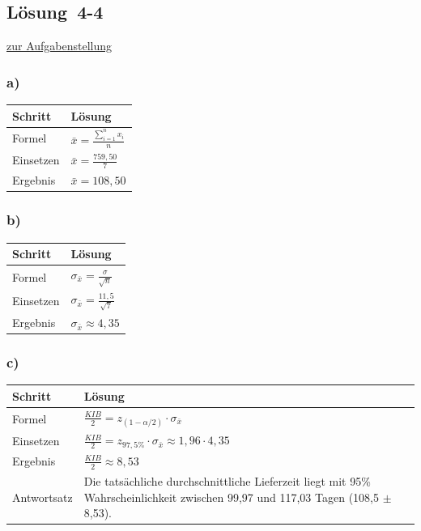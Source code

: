\documentclass[
  11pt,
  ngerman,
  a4paper,
]{report}
\begin{document}
\hypertarget{loesung-4-4}{%
\subsection{Lösung~4-4}\label{loesung-4-4}}

\protect\hyperlink{aufgabe-4-4}{zur Aufgabenstellung}

\hypertarget{a-17}{%
\subsubsection{a)}\label{a-17}}

\begin{table}[H]
\centering
\begin{tabular}{ll}
\toprule
\textbf{Schritt} & \textbf{Lösung}\\
\midrule
Formel & $\bar{x}=\frac{\sum\limits_{i=1}^{n}x_{i}}{n}$\\
Einsetzen & $\bar{x}=\frac{759{,}50}{7}$\\
Ergebnis & $\bar{x}=108{,}50$\\
\bottomrule
\end{tabular}
\end{table}

\hypertarget{b-18}{%
\subsubsection{b)}\label{b-18}}

\begin{table}[H]
\centering
\begin{tabular}{ll}
\toprule
\textbf{Schritt} & \textbf{Lösung}\\
\midrule
Formel & $\sigma_{\bar{x}}=\frac{\sigma}{\sqrt{n}}$\\
Einsetzen & $\sigma_{\bar{x}}=\frac{11{,}5}{\sqrt{7}}$\\
Ergebnis & $\sigma_{\bar{x}}\approx4{,}35$\\
\bottomrule
\end{tabular}
\end{table}

\hypertarget{c-12}{%
\subsubsection{c)}\label{c-12}}

\begin{table}[H]
\centering
\begin{tabular}{ll}
\toprule
\textbf{Schritt} & \textbf{Lösung}\\
\midrule
Formel & $\frac{\mathit{KIB}}{2} = z_{(1-\alpha/2)} \cdot \sigma_{\bar{x}}$\\
Einsetzen & $\frac{\mathit{KIB}}{2} = z_{97{,}5\%} \cdot \sigma_{\bar{x}} \approx 1{,}96 \cdot 4{,}35$\\
Ergebnis & $\frac{\mathit{KIB}}{2} \approx 8{,}53$\\
Antwortsatz & Die tatsächliche durchschnittliche Lieferzeit liegt mit 95\% Wahrscheinlichkeit zwischen 99,97 und 117,03 Tagen (108,5 $\pm$ 8,53).\\
\bottomrule
\end{tabular}
\end{table}
\end{document}
